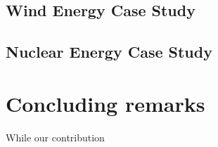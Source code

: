 \subsection{Wind Energy Case Study}
\todo{}

\subsection{ Nuclear Energy Case Study}
\todo{}

\section{Concluding remarks}
\label{sec:corpusCreation.concludingremarks}


While our contribution


